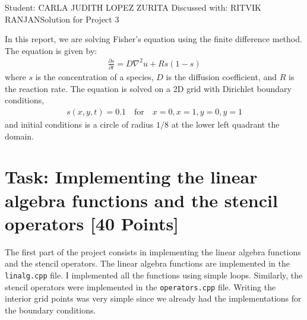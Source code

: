 \documentclass[unicode,11pt,a4paper,oneside,numbers=endperiod,openany]{scrartcl}
\begin{document}
\setassignment
{}

            {Student: CARLA JUDITH LOPEZ ZURITA}
            {Discussed with: RITVIK RANJAN}{Solution for Project 3}{}
\newline

In this report, we are solving Fisher's equation using the finite difference
method. The equation is given by:
\begin{align}
    \frac{\partial s}{\partial t} = D \nabla^2 u + R s (1 - s)
\end{align}
where $s$ is the concentration of a species, $D$ is the diffusion coefficient,
and $R$ is the reaction rate. The equation is solved on a 2D grid with
Dirichlet boundary conditions,
\begin{align}
    s(x, y, t) = 0.1 \quad \text{for} \quad x = 0, x = 1, y = 0, y = 1
\end{align}
and initial conditions is a circle of radius $1/8$ at the lower left quadrant the domain.
\section{Task: Implementing the linear algebra functions and the stencil
         operators [40 Points]}

The first part of the project consists in implementing the linear algebra functions and
the stencil operators. The linear algebra functions are implemented in the
\texttt{linalg.cpp} file. I implemented all the functions using
simple loops.
Similarly, the stencil operators were implemented in the
\texttt{operators.cpp} file. Writing the interior grid points was very simple since
we already had the implementations for the boundary conditions.
\end{document}
